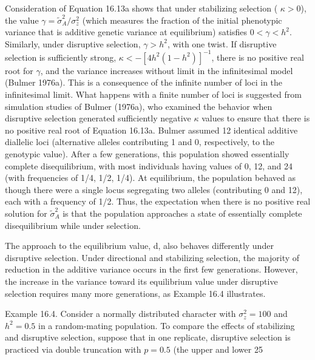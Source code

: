 \documentclass{article}
\begin{document}
Consideration of Equation 16.13a shows that under stabilizing selection ( $ \kappa > 0 $), the value  $ \gamma = \widetilde{\sigma}_A^2 / \sigma_z^2 $ (which measures the fraction of the initial phenotypic variance that is additive genetic variance at equilibrium) satisfies  $ 0 < \gamma < h^2 $. Similarly, under disruptive selection,  $ \gamma > h^2 $, with one twist. If disruptive selection is sufficiently strong,  $ \kappa < -[4h^2(1 - h^2)]^{-1} $, there is no positive real root for  $ \gamma $, and the variance increases without limit in the infinitesimal model (Bulmer 1976a). This is a consequence of the infinite number of loci in the infinitesimal limit. What happens with a finite number of loci is suggested from simulation studies of Bulmer (1976a), who examined the behavior when disruptive selection generated sufficiently negative  $ \kappa $ values to ensure that there is no positive real root of Equation 16.13a. Bulmer assumed 12 identical additive diallelic loci (alternative alleles contributing 1 and 0, respectively, to the genotypic value). After a few generations, this population showed essentially complete disequilibrium, with most individuals having values of 0, 12, and 24 (with frequencies of 1/4, 1/2, 1/4). At equilibrium, the population behaved as though there were a single locus segregating two alleles (contributing 0 and 12), each with a frequency of 1/2. Thus, the expectation when there is no positive real solution for  $ \widetilde{\sigma}_A^2 $ is that the population approaches a state of essentially complete disequilibrium while under selection.

The approach to the equilibrium value, d, also behaves differently under disruptive selection. Under directional and stabilizing selection, the majority of reduction in the additive variance occurs in the first few generations. However, the increase in the variance toward its equilibrium value under disruptive selection requires many more generations, as Example 16.4 illustrates.

Example 16.4. Consider a normally distributed character with  $ \sigma_z^2 = 100 $ and  $ h^2 = 0.5 $ in a random-mating population. To compare the effects of stabilizing and disruptive selection, suppose that in one replicate, disruptive selection is practiced via double truncation with  $ p = 0.5 $ (the upper and lower 25%
\end{document}
